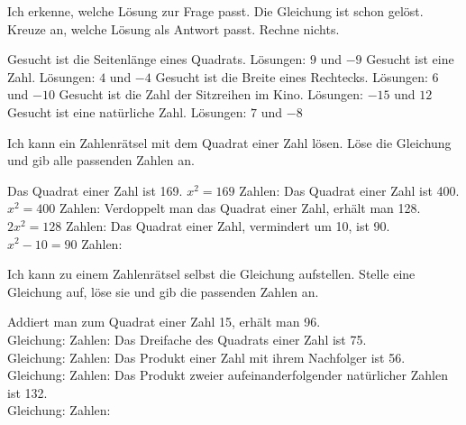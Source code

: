 \setcounter{aufgabe}{39}

\begin{aufgabe}{Ich erkenne, welche Lösung zur Frage passt.}
Die Gleichung ist schon gelöst. Kreuze an, welche Lösung als Antwort passt. Rechne nichts.
\begin{teile}
\teil Gesucht ist die Seitenlänge eines Quadrats. Lösungen: $9$ und $-9$ \hfill {}  
\teil Gesucht ist eine Zahl. Lösungen: $4$ und $-4$ \hfill {}  
\teil Gesucht ist die Breite eines Rechtecks. Lösungen: $6$ und $-10$ \hfill {}  
\teil Gesucht ist die Zahl der Sitzreihen im Kino. Lösungen: $-15$ und $12$ \hfill {}  
\teil Gesucht ist eine natürliche Zahl. Lösungen: $7$ und $-8$ \hfill {}  
\end{teile}
\end{aufgabe}

\begin{aufgabe}{Ich kann ein Zahlenrätsel mit dem Quadrat einer Zahl lösen.}
Löse die Gleichung und gib alle passenden Zahlen an.
\begin{teile}
\teil Das Quadrat einer Zahl ist 169. \quad $x^2 = 169$ \hfill Zahlen: \leerfeld
\teil Das Quadrat einer Zahl ist 400. \quad $x^2 = 400$ \hfill Zahlen: \leerfeld
\teil Verdoppelt man das Quadrat einer Zahl, erhält man 128. \quad $2x^2 = 128$ \hfill Zahlen: \leerfeld
\teil Das Quadrat einer Zahl, vermindert um 10, ist 90. \quad $x^2 - 10 = 90$ \hfill Zahlen: \leerfeld
\end{teile}
\end{aufgabe}

\begin{aufgabe}{Ich kann zu einem Zahlenrätsel selbst die Gleichung aufstellen.}
Stelle eine Gleichung auf, löse sie und gib die passenden Zahlen an.
\begin{teile}
\teil Addiert man zum Quadrat einer Zahl 15, erhält man 96. \\ Gleichung: \leerfeld \quad Zahlen: \leerfeld
\teil Das Dreifache des Quadrats einer Zahl ist 75. \\ Gleichung: \leerfeld \quad Zahlen: \leerfeld
\teil Das Produkt einer Zahl mit ihrem Nachfolger ist 56. \\ Gleichung: \leerfeld \quad Zahlen: \leerfeld
\teil Das Produkt zweier aufeinanderfolgender natürlicher Zahlen ist 132. \\ Gleichung: \leerfeld \quad Zahlen: \leerfeld
\end{teile}
\end{aufgabe}

